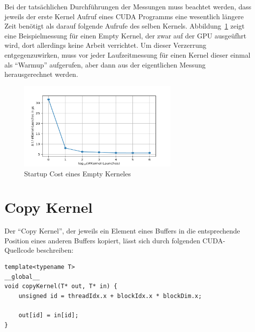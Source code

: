 \documentclass[11pt, abstract=on]{scrartcl}
\begin{document}
Bei der tatsächlichen Durchführungen der Messungen muss beachtet werden, dass jeweils der erste Kernel Aufruf eines CUDA Programms eine wesentlich längere Zeit benötigt als darauf folgende Aufrufe des selben Kernels. Abbildung~\ref{fig:StartupCost} zeigt eine Beispielmessung für einen Empty Kernel, der zwar auf der GPU ausgeüfhrt wird, dort allerdings keine Arbeit verrichtet. Um dieser Verzerrung entgegenzuwirken, muss vor jeder Laufzeitmessung für einen Kernel dieser einmal als "`Warmup"' aufgerufen, aber dann aus der eigentlichen Messung herausgerechnet werden.

\begin{figure} [htbp]
 	\centering
 		\includegraphics[width=0.7\textwidth]{Graph_Startup.png}
 	\caption{Startup Cost eines Empty Kerneles}
 	\label{fig:StartupCost}
\end{figure}

\section{Copy Kernel} \label{CopyKernel}

Der "`Copy Kernel"', der jeweils ein Element eines Buffers in die entsprechende Position eines anderen Buffers kopiert, lässt sich durch folgenden CUDA-Quellcode beschreiben:

\begin{lstlisting} 
template<typename T>
__global__
void copyKernel(T* out, T* in) {
	unsigned id = threadIdx.x + blockIdx.x * blockDim.x;
		
	out[id] = in[id];
}
\end{lstlisting}
\end{document}
